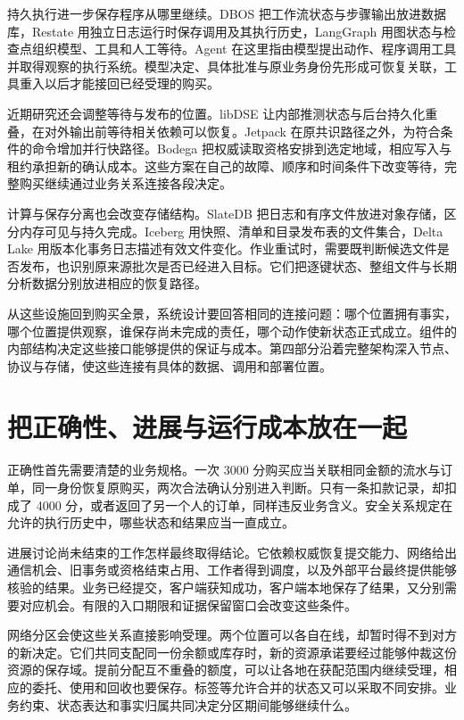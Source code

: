 持久执行进一步保存程序从哪里继续。DBOS 把工作流状态与步骤输出放进数据库，Restate 用独立日志运行时保存调用及其执行历史，LangGraph 用图状态与检查点组织模型、工具和人工等待。Agent 在这里指由模型提出动作、程序调用工具并取得观察的执行系统。模型决定、具体批准与原业务身份先形成可恢复关联，工具重入以后才能接回已经受理的购买。

近期研究还会调整等待与发布的位置。libDSE 让内部推测状态与后台持久化重叠，在对外输出前等待相关依赖可以恢复。Jetpack 在原共识路径之外，为符合条件的命令增加并行快路径。Bodega 把权威读取资格安排到选定地域，相应写入与租约承担新的确认成本。这些方案在自己的故障、顺序和时间条件下改变等待，完整购买继续通过业务关系连接各段决定。

计算与保存分离也会改变存储结构。SlateDB 把日志和有序文件放进对象存储，区分内存可见与持久完成。Iceberg 用快照、清单和目录发布表的文件集合，Delta Lake 用版本化事务日志描述有效文件变化。作业重试时，需要既判断候选文件是否发布，也识别原来源批次是否已经进入目标。它们把逐键状态、整组文件与长期分析数据分别放进相应的恢复路径。

从这些设施回到购买全景，系统设计要回答相同的连接问题：哪个位置拥有事实，哪个位置提供观察，谁保存尚未完成的责任，哪个动作使新状态正式成立。组件的内部结构决定这些接口能够提供的保证与成本。第四部分沿着完整架构深入节点、协议与存储，使这些连接有具体的数据、调用和部署位置。

\section*{把正确性、进展与运行成本放在一起}

正确性首先需要清楚的业务规格。一次 3000 分购买应当关联相同金额的流水与订单，同一身份恢复原购买，两次合法确认分别进入判断。只有一条扣款记录，却扣成了 4000 分，或者返回了另一个人的订单，同样违反业务含义。安全关系规定在允许的执行历史中，哪些状态和结果应当一直成立。

进展讨论尚未结束的工作怎样最终取得结论。它依赖权威恢复提交能力、网络给出通信机会、旧事务或资格结束占用、工作者得到调度，以及外部平台最终提供能够核验的结果。业务已经提交，客户端获知成功，客户端本地保存了结果，又分别需要对应机会。有限的入口期限和证据保留窗口会改变这些条件。

网络分区会使这些关系直接影响受理。两个位置可以各自在线，却暂时得不到对方的新决定。它们共同支配同一份余额或库存时，新的资源承诺要经过能够仲裁这份资源的保存域。提前分配互不重叠的额度，可以让各地在获配范围内继续受理，相应的委托、使用和回收也要保存。标签等允许合并的状态又可以采取不同安排。业务约束、状态表达和事实归属共同决定分区期间能够继续什么。

